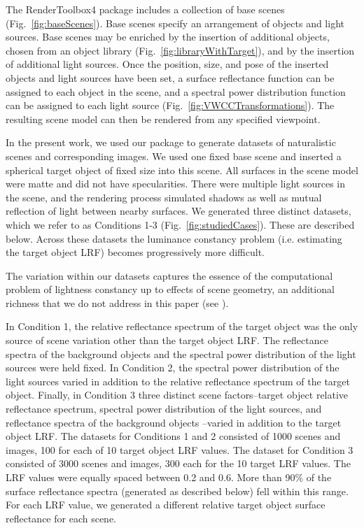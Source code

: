 \documentclass{jov}
\providecommand{\DIFaddbegin}{} %
\newcommand{\DIFaddincludegraphics}[2][]{{\color{blue}\fbox{\DIFOincludegraphics[#1]{#2}}}} %
\DeclareRobustCommand{\DIFaddbegin}{\DIFOaddbegin \let\includegraphics\DIFaddincludegraphics} %
\begin{document}
The RenderToolbox4 package includes a collection of base scenes (Fig.~\ref{fig:baseScenes}).
Base scenes specify an arrangement of objects and light sources.
Base scenes may be enriched by the insertion of additional objects, chosen from an object library (Fig.~\ref{fig:libraryWithTarget}), and by the insertion of additional light sources.
Once the position, size, and pose of the inserted objects and light sources have been set, 
a surface reflectance function can be assigned to each object in the scene, and a spectral power distribution function can be assigned to each light source (Fig.~\ref{fig:VWCCTransformations}). The resulting scene model can then be rendered from any specified viewpoint.

In the present work, we used our package to generate datasets of naturalistic scenes and corresponding images.
We used one fixed base scene and inserted a spherical target object of fixed size into this scene.
All surfaces in the scene model were matte and did not have specularities.
There were multiple light sources in the scene, and the rendering process simulated shadows as well as mutual reflection of light between nearby surfaces.
We generated three distinct datasets, which we refer to as Conditions 1-3 (Fig.~\ref{fig:studiedCases}). These are described below.
Across these datasets the luminance constancy problem (i.e. estimating the target object LRF)
becomes progressively more difficult.

The variation within our datasets captures the essence of the computational problem of lightness constancy
up to effects of scene geometry, an additional richness that we do not address in this paper (see ).

In Condition 1, the relative reflectance spectrum of the target object was the only source of scene variation other than the target object LRF.
The reflectance spectra of the background objects and the spectral power distribution of the light sources were held fixed.
In Condition 2, the spectral power distribution of the light sources varied in addition to the relative reflectance spectrum of the target object.
Finally, in Condition 3 three distinct scene factors--target object relative reflectance spectrum, spectral power distribution of the light sources, and reflectance spectra of the background objects
--varied in addition to the target object LRF.
The datasets for Conditions 1 and 2 consisted of 1000 scenes and images, 100 for each of 10 target object LRF values. 
The dataset for Condition 3 consisted of 3000 scenes and images, 300 each for the 10 target LRF values.
The LRF values were equally spaced between 0.2 and 0.6.
More than 90\% of the surface reflectance spectra (generated as described below) fell within this range.
For each LRF value, we generated a different relative target object surface reflectance for each scene. 
\DIFaddbegin 
\end{document}
